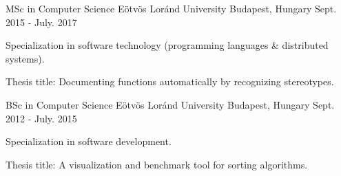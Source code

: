 

\begin{cventries}

  \cventry
    {MSc in Computer Science} %
    {Eötvös Loránd University} %
    {Budapest, Hungary} %
    {Sept. 2015 - July. 2017} %
    {
      \begin{cvitems} %
        \item {Specialization in software technology (programming languages \& distributed systems).}
		    \item {Thesis title: Documenting functions automatically by recognizing stereotypes.}
      \end{cvitems}
    }
  \cventry
    {BSc in Computer Science} %
    {Eötvös Loránd University} %
    {Budapest, Hungary} %
    {Sept. 2012 - July. 2015} %
    {
      \begin{cvitems} %
        \item {Specialization in software development.}
		    \item {Thesis title: A visualization and benchmark tool for sorting algorithms.}
      \end{cvitems}
    }

\end{cventries}
